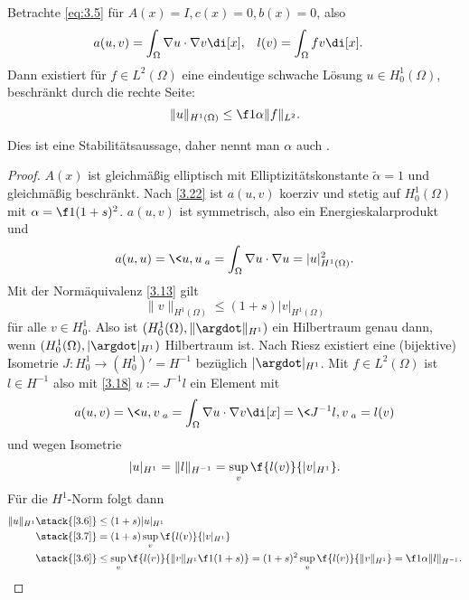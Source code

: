 \begin{st} \label{3.26}
	Betrachte \ref{eq:3.5} für $A(x) = I, c(x) = 0, b(x) = 0$, also
	\begin{align*}
		a(u,v) &= \int_\Omega \nabla u \cdot \nabla v \di[x], &
		l(v) &= \int_\Omega f v \di[x].
	\end{align*}
	Dann existiert für $f \in L^2(\Omega)$ eine eindeutige schwache Lösung $u \in H_0^1(\Omega)$, beschränkt durch die rechte Seite:
	\[
		\|u\|_{H^1(\Omega)} \le \f 1{\alpha} \|f\|_{L^2}.
	\]
	\begin{note}
		Dies ist eine Stabilitätsaussage, daher nennt man $\alpha$ auch .
	\end{note}
	\begin{proof}
		$A(x)$ ist gleichmäßig elliptisch mit Elliptizitätskonstante $\tilde \alpha = 1$ und gleichmäßig beschränkt.
		Nach \ref{3.22} ist $a(u,v)$ koerziv und stetig auf $H_0^1(\Omega)$ mit $\alpha = \f 1{(1+s)^2}$.
		$a(u,v)$ ist symmetrisch, also ein Energieskalarprodukt und
		\[
			a(u,u)
			= \<u,u\>_a
			= \int_\Omega \nabla u \cdot \nabla u
			= |u|_{H^1(\Omega)}^2.
		\]
		Mit der Normäquivalenz \ref{3.13} gilt
		\begin{equation} \label{eq:3.6}
			\|v\|_{H^1(\Omega)}
			\le (1+s) |v|_{H^1(\Omega)}
		\end{equation}
		für alle $v \in H_0^1$.
		Also ist $(H_0^1(\Omega), \|\argdot\|_{H^1})$ ein Hilbertraum genau dann, wenn $(H_0^1(\Omega), |\argdot|_{H^1})$ Hilbertraum ist.
		Nach Riesz existiert eine (bijektive) Isometrie $J: H_0^1 \to (H_0^1)' = H^{-1}$ bezüglich $|\argdot|_{H^1}$.
		Mit $f \in L^2(\Omega)$ ist $l \in H^{-1}$ also mit \ref{3.18} $u := J^{-1} l$ ein Element mit
		\[
			a(u,v)
			= \<u,v\>_a
			= \int_\Omega \nabla u \cdot \nabla v \di[x]
			= \<J^{-1}l, v\>_a
			= l(v)
		\]
		und wegen Isometrie
		\begin{equation} \label{eq:3.7}
			|u|_{H^1} = \|l\|_{H^{-1}}
			= \sup_{v} \f{l(v)}{|v|_{H^1}}.
		\end{equation}
		Für die $H^1$-Norm folgt dann
		\begin{align*}
			\|u\|_{H^1}
			&\stack{\ref{3.6}}\le (1+s)|u|_{H^1} \\
			&\stack{\ref{3.7}}= (1+s) \sup_v \f{l(v)}{|v|_{H^1}} \\
			&\stack{\ref{3.6}}\le \sup_{v} \f{l(v)}{\|v\|_{H^1} \f 1{(1+s)}}
			= (1+s)^2 \sup_v \f{l(v)}{\|v\|_{H^1}}
			= \f 1{\alpha} \|l\|_{H^{-1}}.
		\end{align*}
	\end{proof}
\end{st}

